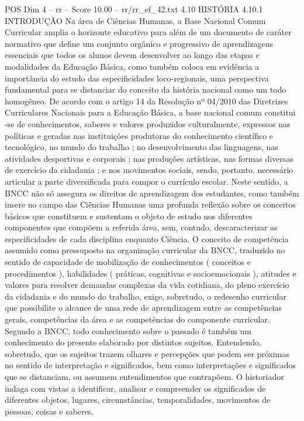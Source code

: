 \begin{textsample}{POS Dim 4 – rr – Score 10.00 – rr/rr\_ef\_42.txt}  \label{ex:f4_pos_118}
4.10 HISTÓRIA 4.10.1 INTRODUÇÃO Na área de Ciências Humanas, a Base Nacional Comum Curricular amplia o horizonte educativo para além de um documento de caráter normativo que define um conjunto orgânico e progressivo de aprendizagens essenciais que todos os alunos devem desenvolver ao longo das etapas e modalidades da Educação Básica, como também coloca em evidência a importância do estudo das especificidades loco-regionais, uma perspectiva fundamental para se distanciar do conceito da história nacional como um todo homogêneo.
De acordo com o artigo 14 da Resolução nº 04/2010 das Diretrizes Curriculares Nacionais para a Educação Básica, a base nacional comum constitui -se de conhecimentos, saberes e valores produzidos culturalmente, expressos nas políticas e geradas nas instituições produtoras do conhecimento científico e tecnológico, no mundo do trabalho ; no desenvolvimento das linguagens, nas atividades desportivas e corporais ; nas produções artísticas, nas formas diversas de exercício da cidadania ; e nos movimentos sociais, sendo, portanto, necessário articular a parte diversificada para compor o currículo escolar.
Neste sentido, a BNCC não só assegura os direitos de aprendizagem dos estudantes, como também insere no campo das Ciências Humanas uma profunda reflexão sobre os conceitos básicos que constituem e sustentam o objeto de estudo nos diferentes componentes que compõem a referida área, sem, contudo, descaracterizar as especificidades de cada disciplina enquanto Ciência.
O conceito de competência assumido como pressuposto na organização curricular da BNCC, traduzido no sentido de capacidade de mobilização de conhecimentos ( conceitos e procedimentos ), habilidades ( práticas, cognitivas e socioemocionais ), atitudes e valores para resolver demandas complexas da vida cotidiana, do pleno exercício da cidadania e do mundo do trabalho, exige, sobretudo, o redesenho curricular que possibilite o alcance de uma rede de aprendizagem entre as competências gerais, competências da área e as competências do componente curricular.
Segundo a BNCC, todo conhecimento sobre o passado é também um conhecimento do presente elaborado por distintos sujeitos.
Entendendo, sobretudo, que os sujeitos trazem olhares e percepções que podem ser próximas no sentido de interpretação e significados, bem como interpretações e significados que se distanciam, ou assumem entendimentos que contrapõem.
O historiador indaga com vistas a identificar, analisar e compreender os significados de diferentes objetos, lugares, circunstâncias, temporalidades, movimentos de pessoas, coisas e saberes.

\end{textsample}
